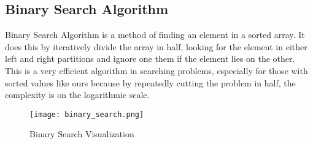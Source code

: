 \subsection{Binary Search Algorithm}
Binary Search Algorithm is a method of finding an element in a sorted array.
It does this by iteratively divide the array in half, looking for the element in either left and right partitions and ignore one them if the element lies on the other.
This is a very efficient algorithm in searching problems, especially for those with sorted values like ours because by repeatedly cutting the problem in half, the complexity is on the logarithmic scale.
\begin{figure}[H]
  \centering
  \texttt{[image: binary\_search.png]}
  \caption{Binary Search Visualization}
\end{figure}
